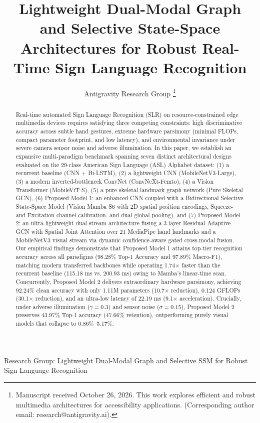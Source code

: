 \documentclass[journal]{IEEEtran}
\begin{document}
\title{Lightweight Dual-Modal Graph and Selective State-Space Architectures for Robust Real-Time Sign Language Recognition}

\author{Antigravity Research Group%
\thanks{Manuscript received October 26, 2026. This work explores efficient and robust multimedia architectures for accessibility applications. (Corresponding author email: research@antigravity.ai).}}

%
{Research Group: Lightweight Dual-Modal Graph and Selective SSM for Robust Sign Language Recognition}

\maketitle

\begin{abstract}
Real-time automated Sign Language Recognition (SLR) on resource-constrained edge multimedia devices requires satisfying three competing constraints: high discriminative accuracy across subtle hand gestures, extreme hardware parsimony (minimal FLOPs, compact parameter footprint, and low latency), and environmental invariance under severe camera sensor noise and adverse illumination. In this paper, we establish an expansive multi-paradigm benchmark spanning seven distinct architectural designs evaluated on the 29-class American Sign Language (ASL) Alphabet dataset: (1) a recurrent baseline (CNN + Bi-LSTM), (2) a lightweight CNN (MobileNetV3-Large), (3) a modern inverted-bottleneck ConvNet (ConvNeXt-Femto), (4) a Vision Transformer (MobileViT-S), (5) a pure skeletal landmark graph network (Pure Skeletal GCN), (6) Proposed Model 1: an enhanced CNN coupled with a Bidirectional Selective State-Space Model (Vision Mamba S6 with 2D spatial position encodings, Squeeze-and-Excitation channel calibration, and dual global pooling), and (7) Proposed Model 2: an ultra-lightweight dual-stream architecture fusing a 3-layer Residual Adaptive GCN with Spatial Joint Attention over 21 MediaPipe hand landmarks and a MobileNetV3 visual stream via dynamic confidence-aware gated cross-modal fusion. Our empirical findings demonstrate that Proposed Model 1 attains top-tier recognition accuracy across all paradigms (98.28\% Top-1 Accuracy and 97.89\% Macro-F1), matching modern transferred backbones while operating 1.74$\times$ faster than the recurrent baseline (115.18 ms vs. 200.93 ms) owing to Mamba's linear-time scan. Concurrently, Proposed Model 2 delivers extraordinary hardware parsimony, achieving 92.24\% clean accuracy with only 1.11M parameters (10.7$\times$ reduction), 0.124 GFLOPs (30.1$\times$ reduction), and an ultra-low latency of 22.19 ms (9.1$\times$ acceleration). Crucially, under adverse illumination ($\gamma = 0.3$) and sensor noise ($\sigma = 0.15$), Proposed Model 2 preserves 43.97\% Top-1 accuracy (47.66\% retention), outperforming purely visual models that collapse to 0.86\%--5.17\%.
\end{abstract}
\end{document}
